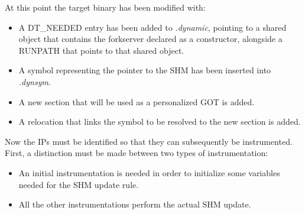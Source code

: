 At this point the target binary has been modified with:
\begin{itemize}
    \item A DT\_NEEDED entry has been added to \textit{.dynamic}, pointing to a shared object that contains 
        the forkserver declared as a constructor, alongside a RUNPATH that points to that shared object.
    \item A symbol representing the pointer to the \gls{SHM} has been inserted into \textit{.dynsym}.
    \item A new section that will be used as a personalized \gls{GOT} is added.
    \item A relocation that links the symbol to be resolved to the new section is added.
\end{itemize}
Now the \gls{IP}s must be identified so that they can subsequently be instrumented.
First, a distinction must be made between two types of instrumentation: 
\begin{itemize}
    \item An initial instrumentation is needed in order to initialize some variables needed for the \gls{SHM} update rule.
    \item All the other instrumentations perform the actual \gls{SHM} update.
\end{itemize}

